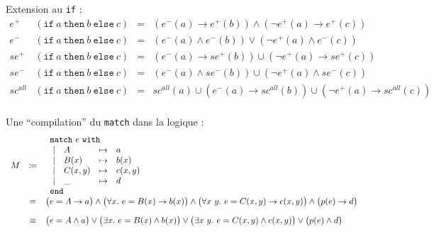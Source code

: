 \documentclass[12pt]{article}
\newcommand{\oif}{\texttt{if}~}
\newcommand{\othen}{~\texttt{then}~}
\newcommand{\oelse}{~\texttt{else}~}
\newcommand{\omatch}{\texttt{match}~}
\newcommand{\owith}{~\texttt{with}}
\newcommand{\oend}{\texttt{end}}
\begin{document}
Extension au \texttt{if} :
$$
  \begin{array}{rlcl}
    e^+      & (\oif a \othen b \oelse c) & = & (e^- (a) \rightarrow e^+ (b)) \land (\neg e^+ (a) \rightarrow e^+ (c))                            \\
    e^-      & (\oif a \othen b \oelse c) & = & (e^- (a) \land e^- (b)) \lor (\neg e^+ (a) \land e^- (c))                                         \\
    se^+     & (\oif a \othen b \oelse c) & = & (e^- (a) \rightarrow se^+ (b)) \cup (\neg e^+ (a) \rightarrow se^+ (c))                           \\
    se^-     & (\oif a \othen b \oelse c) & = & (e^- (a) \land se^- (b)) \cup (\neg e^+ (a) \land se^- (c))                                       \\
    sc^{all} & (\oif a \othen b \oelse c) & = & sc^{all} (a) \cup (e^- (a) \rightarrow sc^{all} (b)) \cup (\neg e^+ (a) \rightarrow sc^{all} (c)) \\
  \end{array}
$$

\bigskip

Une ``compilation'' du \texttt{match} dans la logique :
$$
  \begin{array}{rcl}
    M & \coloneqq &
    \begin{array}{clcl}
      \multicolumn{4}{l}{\omatch e \owith} \\
      ~| & A       & \mapsto & a           \\
      ~| & B(x)    & \mapsto & b(x)        \\
      ~| & C(x, y) & \mapsto & c(x, y)     \\
      ~| & \_      & \mapsto & d           \\
      \multicolumn{4}{l}{\oend}
    \end{array}                                                                                                                                                                    \\
      & \equiv    & \big(e = A \rightarrow a \big) \land \big(\forall x.~ e = B(x) \rightarrow b(x) \big) \land \big(\forall x~y.~ e = C(x, y) \rightarrow c(x,y) \big) \land \big(p(e) \rightarrow d \big) \\[10pt]
      & \equiv    & \big(e = A \land a \big) \lor \big(\exists x.~ e = B(x) \land b(x) \big) \lor \big(\exists x~y.~ e = C(x, y) \land c(x,y) \big) \lor \big(p(e) \land d \big)                            \\
  \end{array}
$$
\end{document}
